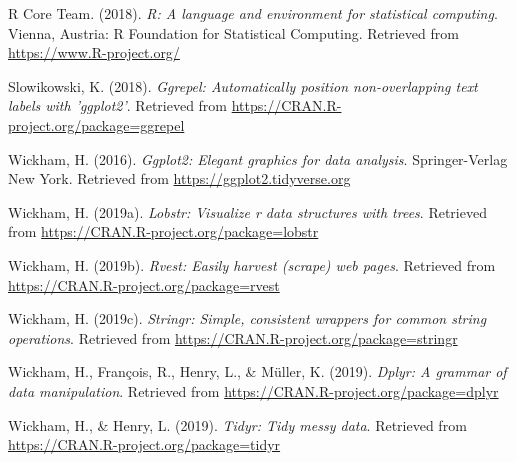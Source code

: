 \documentclass[doc,floatsintext]{apa6}
\begin{document}
\leavevmode\hypertarget{ref-R-base}{}%
R Core Team. (2018). \emph{R: A language and environment for statistical computing}. Vienna, Austria: R Foundation for Statistical Computing. Retrieved from \url{https://www.R-project.org/}

\leavevmode\hypertarget{ref-R-ggrepel}{}%
Slowikowski, K. (2018). \emph{Ggrepel: Automatically position non-overlapping text labels with 'ggplot2'}. Retrieved from \url{https://CRAN.R-project.org/package=ggrepel}

\leavevmode\hypertarget{ref-R-ggplot2}{}%
Wickham, H. (2016). \emph{Ggplot2: Elegant graphics for data analysis}. Springer-Verlag New York. Retrieved from \url{https://ggplot2.tidyverse.org}

\leavevmode\hypertarget{ref-R-lobstr}{}%
Wickham, H. (2019a). \emph{Lobstr: Visualize r data structures with trees}. Retrieved from \url{https://CRAN.R-project.org/package=lobstr}

\leavevmode\hypertarget{ref-R-rvest}{}%
Wickham, H. (2019b). \emph{Rvest: Easily harvest (scrape) web pages}. Retrieved from \url{https://CRAN.R-project.org/package=rvest}

\leavevmode\hypertarget{ref-R-stringr}{}%
Wickham, H. (2019c). \emph{Stringr: Simple, consistent wrappers for common string operations}. Retrieved from \url{https://CRAN.R-project.org/package=stringr}

\leavevmode\hypertarget{ref-R-dplyr}{}%
Wickham, H., François, R., Henry, L., \& Müller, K. (2019). \emph{Dplyr: A grammar of data manipulation}. Retrieved from \url{https://CRAN.R-project.org/package=dplyr}

\leavevmode\hypertarget{ref-R-tidyr}{}%
Wickham, H., \& Henry, L. (2019). \emph{Tidyr: Tidy messy data}. Retrieved from \url{https://CRAN.R-project.org/package=tidyr}

\endgroup
\end{document}
